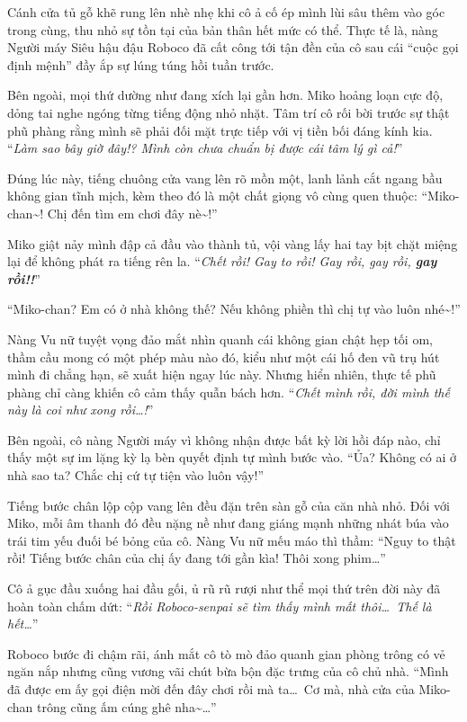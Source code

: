 \documentclass[../main.tex]{subfiles}
\begin{document}

Cánh cửa tủ gỗ khẽ rung lên nhè nhẹ khi cô ả cố ép mình lùi sâu thêm vào góc trong cùng, thu nhỏ sự tồn tại của bản thân hết mức có thể. Thực tế là, nàng Người máy Siêu hậu đậu Roboco đã cất công tới tận đền của cô sau cái ``cuộc gọi định mệnh'' đầy ắp sự lúng túng hồi tuần trước.

Bên ngoài, mọi thứ dường như đang xích lại gần hơn. Miko hoảng loạn cực độ, dỏng tai nghe ngóng từng tiếng động nhỏ nhặt. Tâm trí cô rối bời trước sự thật phũ phàng rằng mình sẽ phải đối mặt trực tiếp với vị tiền bối đáng kính kia. ``\textit{Làm sao bây giờ đây!? Mình còn chưa chuẩn bị được cái tâm lý gì cả!}''

Đúng lúc này, tiếng chuông cửa vang lên rõ mồn một, lanh lảnh cắt ngang bầu không gian tĩnh mịch, kèm theo đó là một chất giọng vô cùng quen thuộc: ``Miko-chan\~{}! Chị đến tìm em chơi đây nè\~{}!''

Miko giật nảy mình đập cả đầu vào thành tủ, vội vàng lấy hai tay bịt chặt miệng lại để không phát ra tiếng rên la. ``\textit{Chết rồi! Gay to rồi! Gay rồi, gay rồi, \textbf{gay rồi!!}}''

``Miko-chan? Em có ở nhà không thế? Nếu không phiền thì chị tự vào luôn nhé\~{}!''

Nàng Vu nữ tuyệt vọng đảo mắt nhìn quanh cái không gian chật hẹp tối om, thầm cầu mong có một phép màu nào đó, kiểu như một cái hố đen vũ trụ hút mình đi chẳng hạn, sẽ xuất hiện ngay lúc này. Nhưng hiển nhiên, thực tế phũ phàng chỉ càng khiến cô cảm thấy quẫn bách hơn. ``\textit{Chết mình rồi, đời mình thế này là coi như xong rồi\dots!}''

Bên ngoài, cô nàng Người máy vì không nhận được bất kỳ lời hồi đáp nào, chỉ thấy một sự im lặng kỳ lạ bèn quyết định tự mình bước vào. ``Ủa? Không có ai ở nhà sao ta? Chắc chị cứ tự tiện vào luôn vậy!''

Tiếng bước chân lộp cộp vang lên đều đặn trên sàn gỗ của căn nhà nhỏ. Đối với Miko, mỗi âm thanh đó đều nặng nề như đang giáng mạnh những nhát búa vào trái tim yếu đuối bé bỏng của cô. Nàng Vu nữ mếu máo thì thầm: ``Nguy to thật rồi! Tiếng bước chân của chị ấy đang tới gần kìa! Thôi xong phim\dots''

Cô ả gục đầu xuống hai đầu gối, ủ rũ rũ rượi như thể mọi thứ trên đời này đã hoàn toàn chấm dứt: ``\textit{Rồi Roboco-senpai sẽ tìm thấy mình mất thôi\dots\ Thế là hết\dots}''

Roboco bước đi chậm rãi, ánh mắt cô tò mò đảo quanh gian phòng trông có vẻ ngăn nắp nhưng cũng vương vãi chút bừa bộn đặc trưng của cô chủ nhà. ``Mình đã được em ấy gọi điện mời đến đây chơi rồi mà ta\dots\ Cơ mà, nhà cửa của Miko-chan trông cũng ấm cúng ghê nha\~{}\dots''
\end{document}

